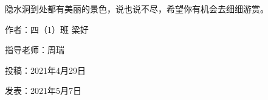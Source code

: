  隐水洞到处都有美丽的景色，说也说不尽，希望你有机会去细细游赏。


\vspace{10pt}

作者：四（1）班  梁好



指导老师：周瑞





投稿：2021年4月29日



发表：2021年5月7日














\vspace{10pt}

\hline



